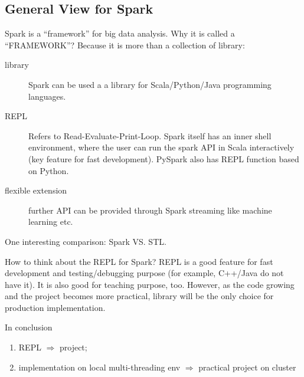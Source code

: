 \documentclass[notheorems, aspectratio=54]{beamer}
\begin{document}

\subsection{General View for Spark}
\begin{frame}

Spark is a ``framework'' for big data analysis. Why it is called a ``FRAMEWORK''? 
Because it is more than a collection of library:
\begin{description}
 \item [library] Spark can be used a a library for Scala/Python/Java programming languages.
 \item [REPL] Refers to Read-Evaluate-Print-Loop. Spark itself has an inner shell environment, 
 where the user can run the spark API in Scala interactively (key feature for fast development). 
 PySpark also has REPL function based on Python. 
 \item [flexible extension] further API can be provided through Spark streaming like
 machine learning etc.
\end{description}

One interesting comparison: Spark VS. STL.

\end{frame}

\begin{frame}


    \begin{block}{How to think about the REPL for Spark?}
    REPL is a good feature for fast development and testing/debugging purpose
    (for example, C++/Java do not have it). It is also 
    good for teaching purpose, too. However, as the code growing and the project 
    becomes more practical, library will be the only 
    choice for production implementation.     
    \end{block}
    
    In conclusion
   \begin{enumerate}
    \item  REPL $\Longrightarrow$ project;
    \item  implementation on local multi-threading env $\Longrightarrow$ practical project on cluster
   \end{enumerate}
      
\end{frame}
\end{document}
